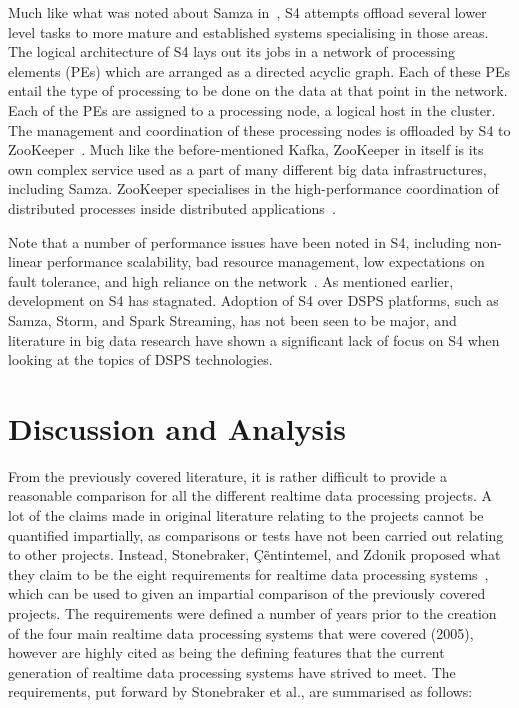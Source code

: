 Much like what was noted about Samza in~, S4 attempts offload several lower level tasks to more
mature and established systems specialising in those areas. The logical architecture of S4 lays out its jobs in a
network of processing elements (PEs) which are arranged as a directed acyclic graph. Each of these PEs entail the type
of processing to be done on the data at that point in the network. Each of the PEs are assigned to a processing node, a
logical host in the cluster. The management and coordination of these processing nodes is offloaded by S4 to
ZooKeeper~\cite{kamburugamuve_survey_2014}. Much like the before-mentioned Kafka, ZooKeeper in itself is its own complex
service used as a part of many different big data infrastructures, including Samza. ZooKeeper specialises in the
high-performance coordination of distributed processes inside distributed applications~\cite{hunt2010zookeeper}.

Note that a number of performance issues have been noted in S4, including non-linear performance scalability, bad
resource management, low expectations on fault tolerance, and high reliance on the network~\cite{chauhan2012performance}.
As mentioned earlier, development on S4 has stagnated. Adoption of S4 over DSPS platforms, such as Samza, Storm,
and Spark Streaming, has not been seen to be major, and literature in big data research have shown a significant lack of
focus on S4 when looking at the topics of DSPS technologies.




\section{Discussion and Analysis} %
\label{sub:processing_conclusion}

From the previously covered literature, it is rather difficult to provide a reasonable comparison for all the different
realtime data processing projects. A lot of the claims made in original literature relating to the projects cannot be
quantified impartially, as comparisons or tests have not been carried out relating to other projects. Instead, Stonebraker,
\c{C}\~entintemel, and Zdonik proposed what they claim to be the eight requirements for realtime data processing systems~\cite{stonebraker_8_2005},
which can be used to given an impartial comparison of the previously covered projects. The requirements were defined a
number of years prior to the creation of the four main realtime data processing systems that were covered (2005), however are highly
cited as being the defining features that the current generation of realtime data processing systems have strived to meet.
The requirements, put forward by Stonebraker et al., are summarised as follows:

